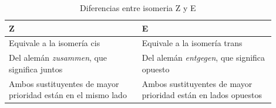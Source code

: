 \begin{table}[H]
\centering
\caption{Diferencias entre isomeria Z y E}
\label{tab:diferencias_z_e}
\begin{threeparttable}
{
\begin{tabular}{p{0.45\linewidth}p{0.45\linewidth}}\hline

    \textbf{Z} & \textbf{E} \\ \hline
    
    Equivale a la isomería cis & Equivale a la isomería trans \\
    Del alemán \textit{zusammen}, que significa juntos & Del alemán \textit{entgegen}, que significa opuesto \\
    Ambos sustituyentes de mayor prioridad están en el mismo lado & Ambos sustituyentes de mayor prioridad están en lados opuestos \\
    
    \hline
\end{tabular}
}
\begin{tablenotes} %
    \item[] 
\end{tablenotes}
\end{threeparttable}
\end{table}